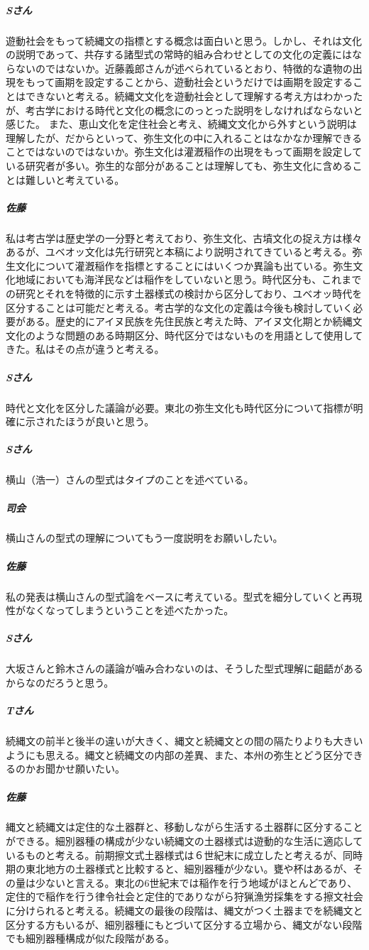 \documentclass[a4j,11pt,twocolumn,openany]{jsbook}
\begin{document}
\subparagraph{Sさん}遊動社会をもって続縄文の指標とする概念は面白いと思う。しかし、それは文化の説明であって、共存する諸型式の常時的組み合わせとしての文化の定義にはならないのではないか。近藤義郎さんが述べられているとおり、特徴的な遺物の出現をもって画期を設定することから、遊動社会というだけでは画期を設定することはできないと考える。続縄文文化を遊動社会として理解する考え方はわかったが、考古学における時代と文化の概念にのっとった説明をしなければならないと感じた。
また、恵山文化を定住社会と考え、続縄文文化から外すという説明は理解したが、だからといって、弥生文化の中に入れることはなかなか理解できることではないのではないか。弥生文化は灌漑稲作の出現をもって画期を設定している研究者が多い。弥生的な部分があることは理解しても、弥生文化に含めることは難しいと考えている。
\subparagraph{佐藤}私は考古学は歴史学の一分野と考えており、弥生文化、古墳文化の捉え方は様々あるが、ユベオッ文化は先行研究と本稿により説明されてきていると考える。弥生文化について灌漑稲作を指標とすることにはいくつか異論も出ている。弥生文化地域においても海洋民などは稲作をしていないと思う。時代区分も、これまでの研究とそれを特徴的に示す土器様式の検討から区分しており、ユベオッ時代を区分することは可能だと考える。考古学的な文化の定義は今後も検討していく必要がある。歴史的にアイヌ民族を先住民族と考えた時、アイヌ文化期とか続縄文文化のような問題のある時期区分、時代区分ではないものを用語として使用してきた。私はその点が違うと考える。
\subparagraph{Sさん}時代と文化を区分した議論が必要。東北の弥生文化も時代区分について指標が明確に示されたほうが良いと思う。
\subparagraph{Sさん}横山（浩一）さんの型式はタイプのことを述べている。
\subparagraph{司会}横山さんの型式の理解についてもう一度説明をお願いしたい。
\subparagraph{佐藤}私の発表は横山さんの型式論をベースに考えている。型式を細分していくと再現性がなくなってしまうということを述べたかった。
\subparagraph{Sさん}大坂さんと鈴木さんの議論が噛み合わないのは、そうした型式理解に齟齬があるからなのだろうと思う。
\subparagraph{Tさん}続縄文の前半と後半の違いが大きく、縄文と続縄文との間の隔たりよりも大きいようにも思える。縄文と続縄文の内部の差異、また、本州の弥生とどう区分できるのかお聞かせ願いたい。
\subparagraph{佐藤}縄文と続縄文は定住的な土器群と、移動しながら生活する土器群に区分することができる。細別器種の構成が少ない続縄文の土器様式は遊動的な生活に適応しているものと考える。前期擦文式土器様式は６世紀末に成立したと考えるが、同時期の東北地方の土器様式と比較すると、細別器種が少ない。甕や杯はあるが、その量は少ないと言える。東北の6世紀末では稲作を行う地域がほとんどであり、定住的で稲作を行う律令社会と定住的でありながら狩猟漁労採集をする擦文社会に分けられると考える。続縄文の最後の段階は、縄文がつく土器までを続縄文と区分する方もいるが、細別器種にもとづいて区分する立場から、縄文がない段階でも細別器種構成が似た段階がある。
\end{document}
